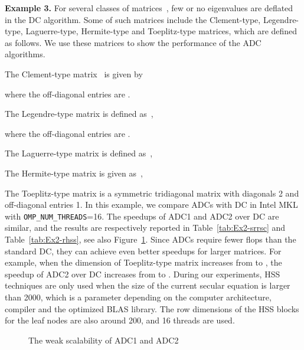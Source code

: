 \documentclass[times]{nlaauth}
\newcounter{algorithm}
\begin{document}
{\bf Example 3.}
For several classes of matrices~\cite{A880}, few or no eigenvalues are deflated
in the DC algorithm. Some of such matrices include
the Clement-type, Legendre-type, Laguerre-type, Hermite-type and Toeplitz-type matrices, which are defined as follows.
We use these matrices to show the performance of the ADC algorithms.

The Clement-type matrix~\cite{A880} is given by

where the off-diagonal entries are .

The Legendre-type matrix is defined as~\cite{A880,Handbook-Func},

where the off-diagonal entries are .

The Laguerre-type matrix is defined as~\cite{A880},


The Hermite-type matrix is given as~\cite{A880},


The Toeplitz-type matrix is a symmetric tridiagonal matrix with diagonals 2 and
off-diagonal entries 1.
In this example, we compare ADCs with DC in Intel MKL with
\texttt{OMP\_NUM\_THREADS}=16.
The speedups of ADC1 and ADC2 over DC are similar, and
the results are respectively reported in Table~\ref{tab:Ex2-srrsc} and Table~\ref{tab:Ex2-rhss},
see also Figure~\ref{fig:speedup}.
Since ADCs require fewer flops than the standard DC, they can achieve even better speedups for
larger matrices.
For example, when the dimension of Toeplitz-type matrix increases from  to
, the speedup of ADC2 over DC increases from  to .
During our experiments, HSS techniques are only used when the size of the current secular equation is
larger than 2000, which is a parameter depending on the computer architecture,
compiler and the optimized BLAS library.
The row dimensions of the HSS blocks for the leaf nodes are also around 200, and
16 threads are used.


\begin{figure}[ptbh]
\centering
{}
\caption{The weak scalability of ADC1 and ADC2}\label{fig:speedup}
\end{figure}
\end{document}

